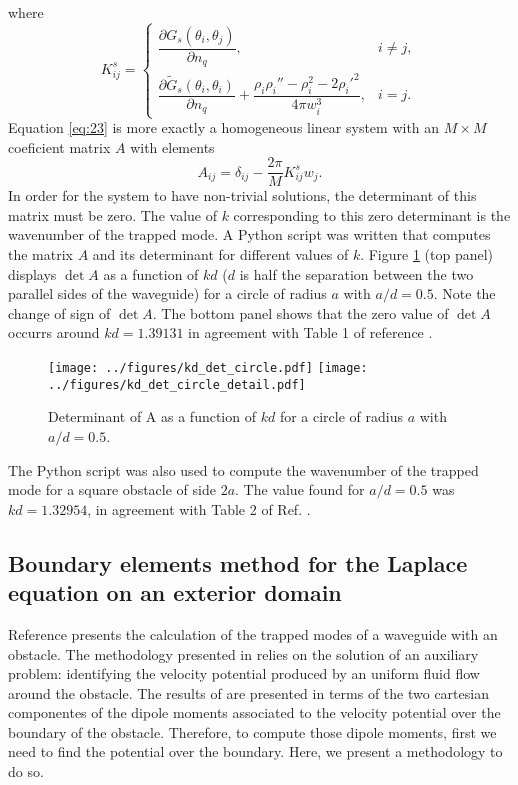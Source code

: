 \documentclass[11pt]{article}
\begin{document}
where
\begin{equation}
  \label{eq:24}
  K^s_{ij} =
\begin{cases}
\dfrac{\partial G_s(\theta_i,\theta_j)}{\partial n_q}, 
& i \ne j, \\[1em]
\dfrac{\partial \tilde{G}_s(\theta_i,\theta_i)}{\partial n_q} 
+ \dfrac{\rho_i \rho_i'' - \rho_i^2 - 2\rho_i'^2}{4\pi w_i^3}, 
& i = j .
\end{cases}
\end{equation}
Equation \eqref{eq:23} is more exactly a homogeneous linear system with an $M \times M$ coeficient matrix $A$ with elements
\begin{equation}
  \label{eq:25}
A_{ij} =  \delta_{ij} - \frac{2\pi}{M}K^s_{ij} w_j.
\end{equation}
In order for the system to have non-trivial solutions, the determinant of this matrix must be zero. The value of $k$ corresponding to this zero determinant is the wavenumber of the trapped mode. A Python script was written that computes the matrix $A$ and its determinant for different values of $k$. Figure \ref{fig:kd_det_circle} (top panel) displays $\det A$ as a function of $kd$ ($d$ is half the separation between the two parallel sides of the waveguide) for a circle of radius $a$ with $a/d=0.5$. Note the change of sign of $\det A$. The bottom panel shows that the zero value of $\det A$ occurrs around $kd = 1.39131$ in agreement with Table 1 of reference \cite{linton1992integral}.
\begin{figure}[h]
  \centering
  \texttt{[image: ../figures/kd\_det\_circle.pdf]}
  \texttt{[image: ../figures/kd\_det\_circle\_detail.pdf]}  
  \caption{\label{fig:kd_det_circle} Determinant of A as a function of $kd$ for a circle of radius $a$ with $a/d=0.5$.}
\end{figure}

The Python script was also used to compute the wavenumber of the trapped mode for a square obstacle of side $2a$. The value found for $a/d=0.5$ was $kd=1.32954$, in agreement with Table 2 of Ref. \cite{linton1992integral}.



\subsection{Boundary elements method for the Laplace equation on an exterior domain}
Reference \cite{zhevandrov2025discrete} presents the calculation of the trapped modes of a waveguide with an obstacle. The methodology presented in \cite{zhevandrov2025discrete} relies on the solution of an auxiliary problem: identifying the velocity potential produced by an uniform fluid flow around the obstacle. The results of \cite{zhevandrov2025discrete} are presented in terms of the two cartesian componentes of the dipole moments associated to the velocity potential over the boundary of the obstacle. Therefore, to compute those dipole moments, first we need to find the potential over the boundary. Here, we present a methodology to do so.
\end{document}
